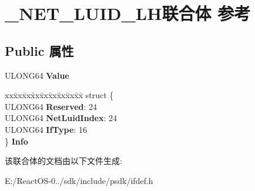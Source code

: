 \hypertarget{union___n_e_t___l_u_i_d___l_h}{}\section{\+\_\+\+N\+E\+T\+\_\+\+L\+U\+I\+D\+\_\+\+L\+H联合体 参考}
\label{union___n_e_t___l_u_i_d___l_h}
\subsection*{Public 属性}
\begin{DoxyCompactItemize}
\item 
\mbox{\label{union___n_e_t___l_u_i_d___l_h_a54f8341592dcca4a5e623614ca9c7a58}} 
U\+L\+O\+N\+G64 {\bfseries Value}
\item 
\mbox{\label{union___n_e_t___l_u_i_d___l_h_ae2611f4be24c6cc740999a83f713db63}} 
\begin{tabbing}
xx\=xx\=xx\=xx\=xx\=xx\=xx\=xx\=xx\=\kill
struct \{\\
\>ULONG64 {\bfseries Reserved}: 24\\
\>ULONG64 {\bfseries NetLuidIndex}: 24\\
\>ULONG64 {\bfseries IfType}: 16\\
\} {\bfseries Info}\\

\end{tabbing}\end{DoxyCompactItemize}


该联合体的文档由以下文件生成\+:\begin{DoxyCompactItemize}
\item 
E\+:/\+React\+O\+S-\/0../sdk/include/psdk/ifdef.\+h\end{DoxyCompactItemize}
